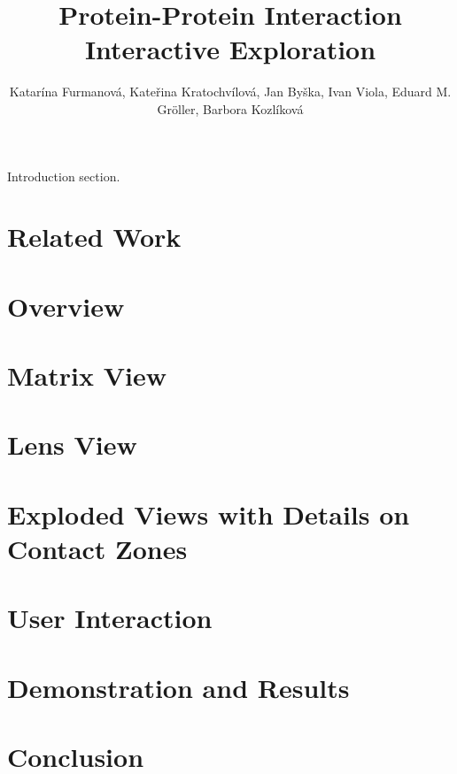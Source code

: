 \documentclass[journal]{vgtc}                %
\title{Protein-Protein Interaction Interactive Exploration}
\author{Katar\'{i}na Furmanov\'{a}, Kate\v{r}ina Kratochv\'{i}lov\'{a}, Jan By\v{s}ka, Ivan Viola, Eduard M. Gr\"{o}ller, Barbora Kozl\'{i}kov\'{a}}
\begin{document}


\maketitle

Introduction section.

\section{Related Work}

\section{Overview}

\section{Matrix View}

\section{Lens View}

\section{Exploded Views with Details on Contact Zones}

\section{User Interaction}

\section{Demonstration and Results}

\section{Conclusion}


%

%
%
%

\end{document}
